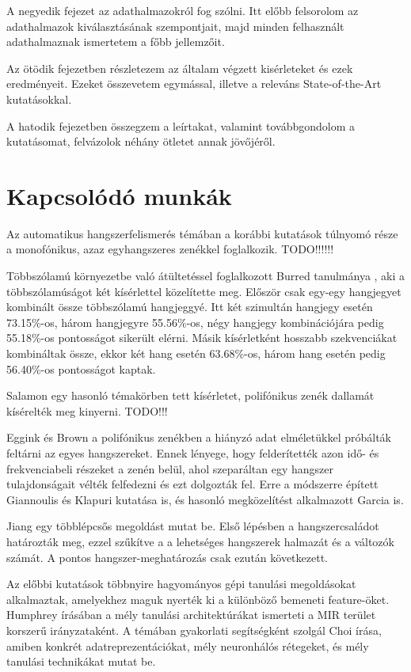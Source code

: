 A negyedik fejezet az adathalmazokról fog szólni. Itt előbb felsorolom az adathalmazok kiválasztásának szempontjait, majd minden felhasznált adathalmaznak ismertetem a főbb jellemzőit. 

Az ötödik fejezetben részletezem az általam végzett kisérleteket és ezek eredményeit. Ezeket összevetem egymással, illetve a releváns State-of-the-Art kutatásokkal.

A hatodik fejezetben összegzem a leírtakat, valamint továbbgondolom a kutatásomat, felvázolok néhány ötletet annak jövőjéről.


\section{Kapcsolódó munkák}

Az automatikus hangszerfelismerés témában a korábbi kutatások túlnyomó része a monofónikus, azaz egyhangszeres zenékkel foglalkozik.  TODO!!!!!!

Többszólamú környezetbe való átültetéssel foglalkozott Burred tanulmánya \cite{burred2010}, aki a többszólamúságot két kísérlettel közelítette meg. Először csak egy-egy hangjegyet kombinált össze többszólamú hangjeggyé. Itt két szimultán hangjegy esetén 73.15\%-os, három hangjegyre 55.56\%-os, négy hangjegy kombinációjára pedig 55.18\%-os pontosságot sikerült elérni. Másik kísérletként hosszabb szekvenciákat kombináltak össze, ekkor két hang esetén 63.68\%-os, három hang esetén pedig 56.40\%-os pontosságot kaptak. 

Salamon \cite{salamon2014} egy hasonló témakörben tett kísérletet, polifónikus zenék dallamát kísérelték meg kinyerni.  TODO!!!

Eggink és Brown \cite{egginkandbrown2003} a polifónikus zenékben a hiányzó adat elméletükkel próbálták feltárni az egyes hangszereket. Ennek lényege, hogy felderítették azon idő- és frekvenciabeli részeket a zenén belül, ahol szeparáltan egy hangszer tulajdonságait vélték felfedezni és ezt dolgozták fel. Erre a módszerre épített Giannoulis és Klapuri \cite{giannoulisandklapuri2013} kutatása is, és hasonló megközelítést alkalmazott Garcia \cite{garcia2011} is.
 
Jiang \cite{Jiang2013} egy többlépcsős megoldást mutat be. Első lépésben a hangszercsaládot határozták meg, ezzel szűkítve a a lehetséges hangszerek halmazát és a változók számát. A pontos hangszer-meghatározás csak ezután következett.

Az előbbi kutatások többnyire hagyományos gépi tanulási megoldásokat alkalmaztak, amelyekhez maguk nyerték ki a különböző bemeneti feature-öket. Humphrey \cite{humphrey2012} írásában a mély tanulási architektúrákat ismerteti a MIR terület korszerű irányzataként. A témában gyakorlati segítségként szolgál Choi \cite{Choi2017} írása, amiben konkrét adatreprezentációkat, mély neuronhálós rétegeket, és mély tanulási technikákat mutat be.

